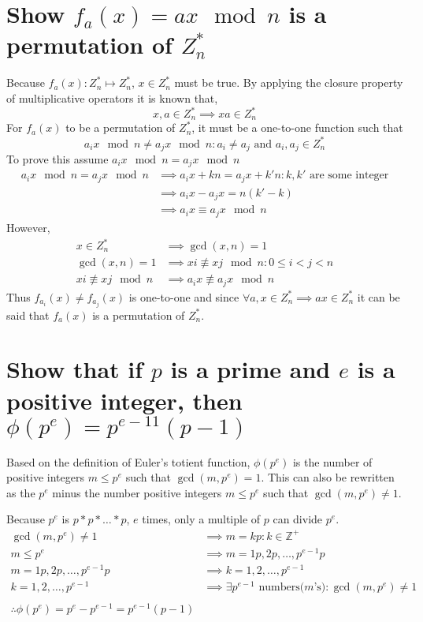 \documentclass[letterpaper]{article}
\begin{document}
\section{Show $f_a(x)=ax\mod n$ is a permutation of $Z_n^*$}
Because $f_a(x):Z_n^* \mapsto Z_n^*$, $x\in Z_n^*$ must be true. By applying the closure property of multiplicative operators it is known that,
\begin{equation*}
x,a\in Z_n^* \implies xa \in Z_n^*
\end{equation*}
For $f_a(x)$ to be a permutation of $Z_n^*$, it must be a one-to-one function such that 
\begin{equation*}
a_ix\mod n \neq a_jx\mod n : a_i\neq a_j \text{ and }a_i,a_j\in Z_n^*
\end{equation*}
To prove this assume $a_ix\mod n = a_jx\mod n$
\begin{align*}
a_ix\mod n = a_jx\mod n &\implies a_ix+kn = a_jx+k'n:k,k' \text{ are some integer}\\
&\implies a_ix-a_jx = n(k'-k)\\
&\implies a_ix \equiv a_jx\mod n
\end{align*}
However,
\begin{align*}
x\in Z_n^* &\implies \gcd(x,n)=1\\
\gcd(x,n)=1 &\implies xi \not\equiv xj\mod n: 0\leq i<j<n\\
xi \not\equiv xj\mod n &\implies a_ix \not\equiv a_jx\mod n
\end{align*}
Thus $f_{a_i}(x) \neq f_{a_j}(x)$ is one-to-one and since $\forall a,x\in Z_n^*\implies ax\in Z_n^*$ it can be said that $f_a(x)$ is a permutation of $Z_n^*$.


\section{Show that if $p$ is a prime and $e$ is a positive integer, then $\phi(p^e) = p^{e-11}(p - 1)$}
Based on the definition of Euler's totient function, $\phi(p^e)$ is the number of positive integers $m\leq p^e$ such that $\gcd(m,p^e)=1$. This can also be rewritten as the $p^e$ minus the number positive integers $m\leq p^e$ such that $\gcd(m,p^e)\neq1$.

Because $p^e$ is $p*p*\ldots*p$, $e$ times, only a multiple of $p$ can divide $p^e$.
\begin{align*}
\gcd(m,p^e) \neq 1 &\implies m= kp: k\in \mathbb{Z^+}\\
m \leq p^e &\implies m=1p,2p,\ldots,p^{e-1}p\\
m=1p,2p,\ldots,p^{e-1}p &\implies k=1,2,\ldots,p^{e-1}\\
k=1,2,\ldots,p^{e-1} &\implies \exists p^{e-1}\text{ numbers($m$'s)}: \gcd(m,p^e) \neq 1\\~\\
\therefore \phi(p^e) = p^e-p^{e-1} = p^{e-1}(p-1)
\end{align*}
\end{document}
